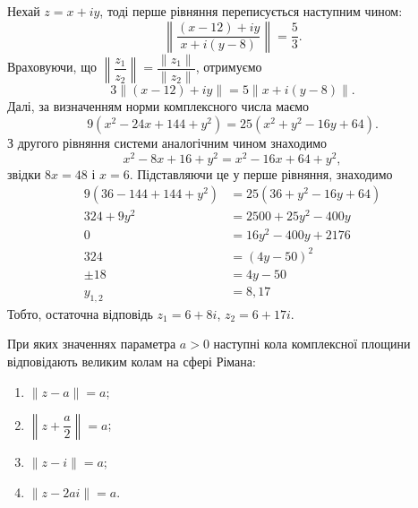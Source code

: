 \begin{solution}
    Нехай $z = x + iy$, тоді перше рівняння переписується наступним чином:
    \[ \left\| \dfrac{(x - 12) + iy}{x + i(y - 8)} \right\| = \dfrac53. \]
    Враховуючи, що $\left\| \dfrac{z_1}{z_2} \right\| = \dfrac{\| z_1 \|}{\| z_2 \|}$, отримуємо
    \[ 3 \|(x - 12) + iy\| = 5 \|x + i(y - 8)\|. \]
    Далі, за визначенням норми комплексного числа маємо
    \[ 9 (x^2 - 24 x + 144 + y^2) = 25 (x^2 + y^2 - 16 y + 64). \]
    З другого рівняння системи аналогічним чином знаходимо
    \[ x^2 - 8x + 16 + y^2 = x^2 - 16 x + 64 + y^2 , \]
    звідки $8x = 48$ і $x = 6$. Підставляючи це у перше рівняння, знаходимо
    \begin{equation*}
    \begin{aligned}
    9 (36 - 144 + 144 + y^2) &= 25 (36 + y^2 - 16 y + 64) \\
    324 + 9 y^2 &= 2500 + 25 y^2 - 400 y \\
    0 &= 16 y^2 - 400 y + 2176 \\
    324 &= (4 y - 50)^2 \\
    \pm 18 &= 4 y - 50 \\
    y_{1, 2} &= 8, 17
    \end{aligned}
    \end{equation*}
    Тобто, остаточна відповідь $z_1 = 6 + 8i$, $z_2 = 6 + 17i$.
\end{solution}

\begin{problem}[1.43, Евграфов]
    При яких значеннях параметра $a > 0$ наступні кола комплексної площини відповідають великим колам на сфері Рімана:
    \begin{enumerate}
        \item $\| z - a \| = a$;
        \item $\left \| z + \dfrac a 2 \right \| = a$;
        \item $\| z - i \| = a$;
        \item $\| z - 2 a i \| = a$.
    \end{enumerate}
\end{problem}

